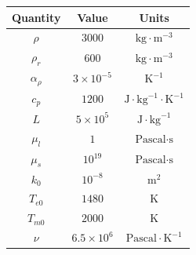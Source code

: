 \documentclass[usenames,dvipsnames,letterpaper,landscape,final]{slides}
\theoremstyle{definition}
\begin{document}
\begin{myslide}

\begin{center}
\begin{tabular}{c | c c}
Quantity & Value & Units \\
\hline
		  $\rho$       & $3000$           & $\text{kg}\cdot \text{m}^{-3}$              \\
		  $\rho_r$       & $600$           & $\text{kg}\cdot \text{m}^{-3}$              \\
		  $\alpha_\rho$  & $3\times10^{-5}$ & $\text{K}^{-1}$                      \\
		  $c_p$          & $1200$           & $\text{J}\cdot \text{kg}^{-1} \cdot \text{K}^{-1}$ \\
		  $L$            & $5\times10^{5}$  & $\text{J}\cdot \text{kg}^{-1}$              \\
		  $\mu_l$        & $1$              & $\text{Pascal} \cdot \text{s}$       \\
		  $\mu_s$        & $10^{19}$        & $\text{Pascal} \cdot \text{s}$       \\
		  $k_0$          & $10^{-8}$        & $\text{m}^2$                         \\
		  $T_{e0}$       & $1480$           & $\text{K}$                           \\
		  $T_{m0}$       & $2000$           & $\text{K}$                           \\
		  $\nu$          & $6.5\times10^6$  & $\text{Pascal} \cdot \text{K}^{-1}$
\end{tabular}
\end{center}


\end{myslide}
\end{document}
